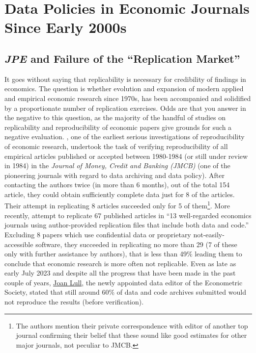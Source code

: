 \documentclass[11pt]{article}
\begin{document}
\newpage
\section{Data Policies in Economic Journals Since Early 2000s}
\label{hist}
\subsection{\textit{JPE} and Failure of the ``Replication Market''}
It goes without saying that replicability is necessary for credibility of findings in economics. The question is whether evolution and expansion of modern applied and empirical economic research since 1970s, has been accompanied and solidified by a proportionate number of replication exercises. Odds are that you answer in the negative to this question, as the majority of the handful of studies on replicability and reproducibility of economic papers give grounds for such a negative evaluation. \cite{dewald1986replication}, one of the earliest serious investigations of reproducibility of economic research, undertook the task of verifying reproducibility of all empirical articles published or accepted between 1980-1984 (or still under review in 1984) in the \textit{Journal of Money, Credit and Banking (JMCB)} (one of the pioneering journals with regard to data archiving and data policy). After contacting the authors twice (in more than 6 months), out of the total 154 article, they could obtain sufficiently complete data just for 8 of the articles. Their attempt in replicating 8 articles succeeded only for 5 of them\footnote{The authors mention their private correspondence with editor of another top journal confirming their belief that these sound like good estimates for other major journals, not peculiar to JMCB.}. More recently, \cite{chang2015economics} attempt to replicate 67 published articles in ``13 well-regarded economics journals using author-provided replication files that include both data and code.'' Excluding 8 papers which use confidential data or proprietary not-easily-accessible software, they succeeded in replicating no more than 29 (7 of these only with further assistance by authors), that is less than 49\% leading them to conclude that economic research is more often not replicable. Even as late as early July 2023 and despite all the progress that have been made in the past couple of years, \href{https://twitter.com/JoanLlull_econ/status/1675154240497483776}{Joan Lull}, the newly appointed data editor of the Econometric Society, stated that still around 60\% of data and code archives submitted would not reproduce the results (before verification).\\
\end{document}
